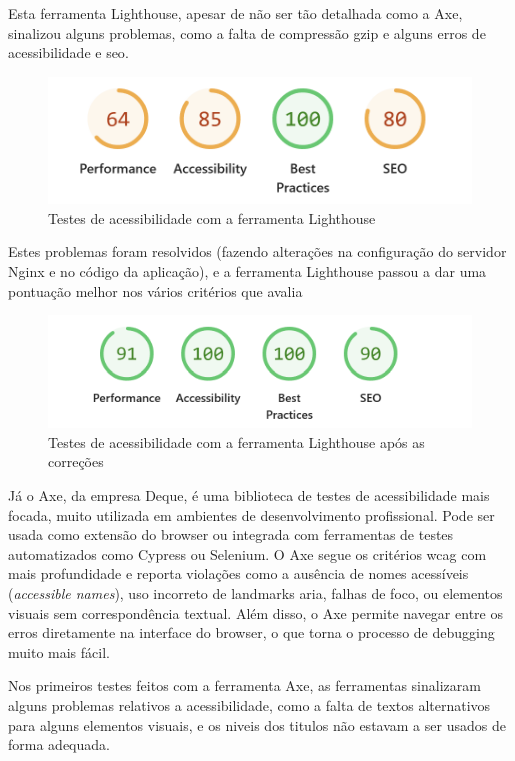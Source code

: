 Esta ferramenta Lighthouse, apesar de não ser tão detalhada como a Axe, sinalizou alguns problemas, como a falta de compressão \gls{gzip} e alguns erros de acessibilidade e \gls{seo}. 

\begin{figure}[H]
\centering
\includegraphics[max width=\textwidth]{./img/lh_before}
\caption{Testes de acessibilidade com a ferramenta Lighthouse}
\end{figure}

Estes problemas foram resolvidos (fazendo alterações na configuração do servidor Nginx e no código da aplicação), e a ferramenta Lighthouse passou a dar uma pontuação melhor nos vários critérios que avalia

\begin{figure}[H]
\centering
\includegraphics[max width=\textwidth]{./img/lh_after}
\caption{Testes de acessibilidade com a ferramenta Lighthouse após as correções}
\end{figure}

Já o Axe, da empresa Deque, é uma biblioteca de testes de acessibilidade mais focada, muito utilizada em ambientes de desenvolvimento profissional. Pode ser usada como extensão do browser ou integrada com ferramentas de testes automatizados como Cypress ou Selenium. O Axe segue os critérios \gls{wcag} com mais profundidade e reporta violações como a ausência de nomes acessíveis (\textit{accessible names}), uso incorreto de landmarks \gls{aria}, falhas de foco, ou elementos visuais sem correspondência textual. Além disso, o Axe permite navegar entre os erros diretamente na interface do browser, o que torna o processo de debugging muito mais fácil.

Nos primeiros testes feitos com a ferramenta Axe, as ferramentas sinalizaram alguns problemas relativos a acessibilidade, como a falta de textos alternativos para alguns elementos visuais, e os niveis dos titulos não estavam a ser usados de forma adequada.

